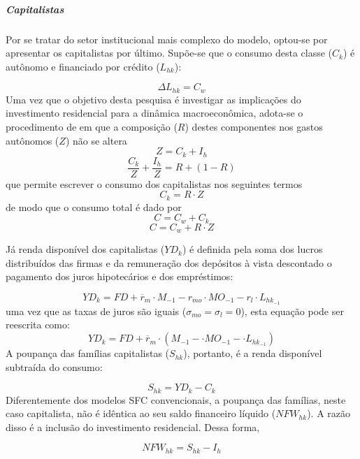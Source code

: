 \subparagraph*{Capitalistas}

Por se tratar do setor institucional mais complexo do modelo, optou-se por apresentar os capitalistas por último. Supõe-se que o consumo desta classe ($C_k$) é autônomo e financiado por crédito ($L_{hk}$):

\begin{equation}
\Delta L_{hk} = C_w
\end{equation}
Uma vez que o objetivo desta pesquisa é investigar as implicações do investimento residencial para a dinâmica macroeconômica, adota-se o procedimento de \textcite{freitas_baseline_2019} em que a composição ($R$) destes componentes nos gastos autônomos ($Z$) não se altera
\begin{equation}
\label{_Z}
Z = C_k + I_h
\end{equation}
$$
\frac{C_k}{Z} + \frac{I_h}{Z} = R + (1-R)
$$
que permite escrever o consumo dos capitalistas nos seguintes termos
\begin{equation}
\label{_Ck}
    C_k = R\cdot Z
\end{equation}
de modo que o consumo total é dado por
\begin{equation}
\label{ConsumoTotal}
C = C_w + C_k
\end{equation}
$$
C = C_w + R\cdot Z
$$

Já renda disponível dos capitalistas ($YD_k$) é definida pela soma dos lucros distribuídos das firmas e da remuneração dos depósitos à vista descontado o pagamento dos juros hipotecários e dos empréstimos:

\begin{equation}
    \label{EqYD}
    YD_k = FD + \overline r_m\cdot M_{-1} - r_{mo}\cdot MO_{-1} - r_{l}\cdot L_{hk_{-1}}
\end{equation}
uma vez que as taxas de juros são iguais ($\sigma_{mo} = \sigma_{l} = 0$), esta equação pode ser reescrita como:
$$
    YD_k = FD + \overline r_m\cdot (M_{-1} - \cdot MO_{-1} - \cdot L_{hk_{-1}})
$$
A poupança das famílias capitalistas ($S_{hk}$), portanto, é a renda disponível subtraída do consumo:

\begin{equation}
    \label{EqSh}
    S_{hk} = YD_k - C_k
\end{equation}
Diferentemente dos modelos SFC convencionais, a poupança das famílias, neste caso capitalista,  não é idêntica ao seu saldo financeiro líquido ($NFW_{hk}$). A razão disso é a inclusão do investimento residencial. Dessa forma, 

\begin{equation}
\label{NFWh}
    NFW_{hk} = S_{hk} - I_h
\end{equation}

